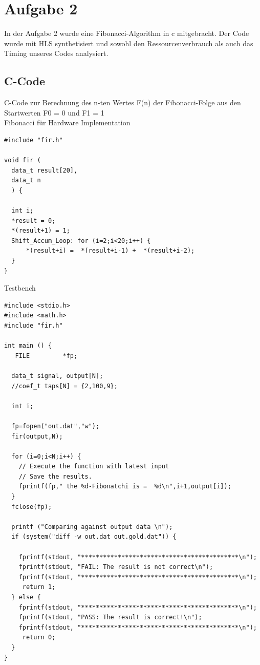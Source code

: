 \section{Aufgabe 2} \label{ex2}
In der Aufgabe 2 wurde eine Fibonacci-Algorithm in c mitgebracht. Der Code wurde mit HLS synthetisiert und sowohl den Ressourcenverbrauch als auch das Timing unseres Codes analysiert.

\subsection{C-Code}
C-Code zur Berechnung des n-ten Wertes F(n) der  Fibonacci-Folge aus den Startwerten F0 = 0 und F1 = 1\\

Fibonacci für Hardware Implementation
\begin{verbatim}
#include "fir.h"

void fir (
  data_t result[20],
  data_t n
  ) {

  int i;
  *result = 0;
  *(result+1) = 1;
  Shift_Accum_Loop: for (i=2;i<20;i++) {
	  *(result+i) =  *(result+i-1) +  *(result+i-2);
  }
}
\end{verbatim}

Testbench
\begin{verbatim}
#include <stdio.h>
#include <math.h>
#include "fir.h"

int main () {
   FILE         *fp;

  data_t signal, output[N];
  //coef_t taps[N] = {2,100,9};

  int i;
  
  fp=fopen("out.dat","w");
  fir(output,N);

  for (i=0;i<N;i++) {
	// Execute the function with latest input
	// Save the results.
    fprintf(fp," the %d-Fibonatchi is =  %d\n",i+1,output[i]);
  }
  fclose(fp);

  printf ("Comparing against output data \n");
  if (system("diff -w out.dat out.gold.dat")) {

	fprintf(stdout, "*******************************************\n");
	fprintf(stdout, "FAIL: The result is not correct\n");
	fprintf(stdout, "*******************************************\n");
     return 1;
  } else {
	fprintf(stdout, "*******************************************\n");
	fprintf(stdout, "PASS: The result is correct!\n");
	fprintf(stdout, "*******************************************\n");
     return 0;
  }
}
\end{verbatim}

